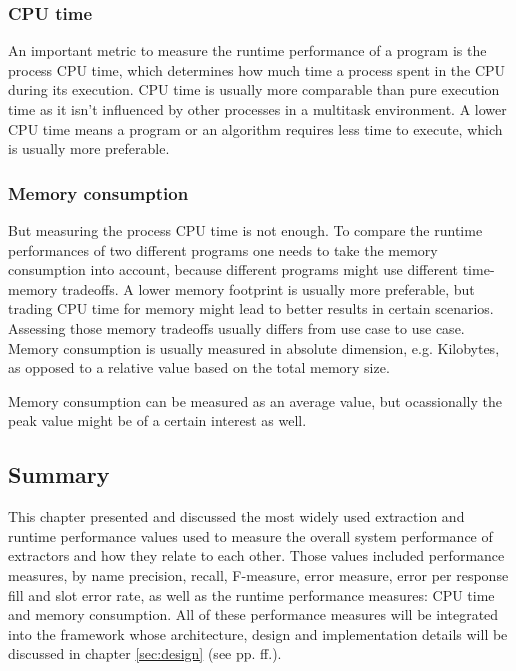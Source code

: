 \subsubsection{CPU time}
An important metric to measure the runtime performance of a program is the process CPU time, which determines how much time  a process spent in the CPU during its execution. CPU time is usually more comparable than pure execution time as it isn't influenced by other processes in a multitask environment. A lower CPU time means a program or an algorithm requires less time to execute, which is usually more preferable.

\subsubsection{Memory consumption}
But measuring the process CPU time is not enough. To compare the runtime performances of two different programs one needs to take the memory consumption into account, because different programs might use different time-memory tradeoffs. A lower memory footprint is usually more preferable, but trading CPU time for memory might lead to better results in certain scenarios. Assessing those memory tradeoffs usually differs from use case to use case. Memory consumption is usually measured in absolute dimension, e.g. Kilobytes, as opposed to a relative value based on the total memory size.

Memory consumption can be measured as an average value, but ocassionally the peak value might be of a certain interest as well.

\newpage
\subsection{Summary}
This chapter presented and discussed the most widely used extraction and runtime performance values used to measure the overall system performance of extractors and how they relate to each other. Those values included performance measures, by name precision, recall, F-measure, error measure, error per response fill and slot error rate, as well as the runtime performance measures: CPU time and memory consumption. All of these performance measures will be integrated into the framework whose architecture, design and implementation details will be discussed in chapter \ref{sec:design} (see pp. \pageref{sec:design}ff.).